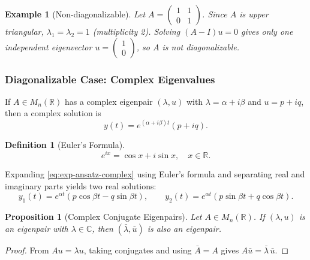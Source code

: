 \documentclass{article}
\newtheorem{definition}{Definition}
\newtheorem*{example}{Example}
\newtheorem{proposition}{Proposition}
\newcommand{\R}{\mathbb{R}}
\begin{document}
\begin{example}[Non-diagonalizable]
    Let $A = \begin{pmatrix}1&1\\0&1\end{pmatrix}$. Since $A$ is 
    upper triangular, $\lambda_1 = \lambda_2 = 1$ (multiplicity 2). 
    Solving $(A-I)u = 0$ gives only one independent eigenvector 
    $u = \begin{pmatrix}1\\0\end{pmatrix}$, so $A$ is 
    \emph{not} diagonalizable.
\end{example}

\subsubsection{Diagonalizable Case: Complex Eigenvalues}

If $A \in M_n(\R)$ has a complex eigenpair 
$(\lambda, u)$ with $\lambda = \alpha + i\beta$ and 
$u = p + iq$, then a complex solution is
\begin{equation}
    \label{eq:exp-ansatz-complex}
    y(t) = e^{(\alpha+i\beta)t}(p+iq).
\end{equation}

\begin{definition}[Euler's Formula]
    \begin{equation}
        \label{eq:EulerFormula}
        e^{ix} = \cos x + i\sin x, \quad x \in \R.
    \end{equation}
\end{definition}

Expanding \eqref{eq:exp-ansatz-complex} using Euler's formula and 
separating real and imaginary parts yields two real solutions:
\begin{equation}
    \label{eq:exp-ansatz-complex-sol}
    y_1(t) = e^{\alpha t}(p\cos\beta t - q\sin\beta t), \qquad 
    y_2(t) = e^{\alpha t}(p\sin\beta t + q\cos\beta t).
\end{equation}

\begin{proposition}[Complex Conjugate Eigenpairs]
    \label{prop:CCE}
    Let $A \in M_n(\R)$. If $(\lambda, u)$ is an eigenpair 
    with $\lambda \in \mathbb{C}$, then $(\bar\lambda, \bar u)$ is 
    also an eigenpair.
\end{proposition}

\begin{proof}
    From $Au = \lambda u$, taking conjugates and using 
    $\bar A = A$ gives $A\bar u = \bar\lambda\,\bar u$.
\end{proof}
\end{document}

